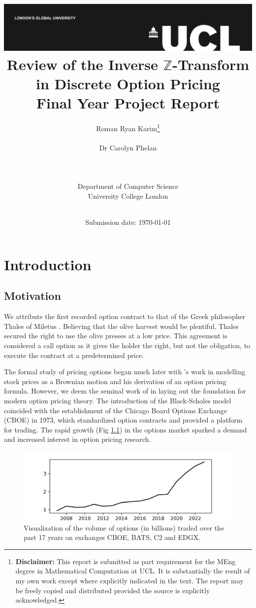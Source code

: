 \documentclass[a4paper]{report}
\title{{\vspace{-14em} \includegraphics[scale=0.4]{Logos/ucl_logo.png}}\\
{{\vspace{2em} \Huge Review of the Inverse $\mathbb{Z}$-Transform in Discrete Option Pricing}}\\
{\large Final Year Project Report}\\
}
\date{Submission date: \today}
\author{Roman Ryan Karim\thanks{
{\bf Disclaimer:}
This report is submitted as part requirement for the MEng degree in Mathematical Computation at UCL. It is substantially the result of my own work except where explicitly indicated in the text. The report may be freely copied and distributed provided the source is explicitly acknowledged.}
\\ \\ Dr Carolyn Phelan
\\ \\ \\ \\ Department of Computer Science
\\ University College London
\\ \\
}
\begin{document}
 
\onehalfspacing
\maketitle
\begin{abstract}

\end{abstract}

\tableofcontents
\setcounter{page}{1}

\chapter{Introduction}
\section{Motivation}
We attribute the first recorded option contract to that of the Greek philosopher Thales of Miletus \citep{thompson1994aristotle}. Believing that the olive harvest would be plentiful, Thales secured the right to use the olive presses at a low price. This agreement is considered a call option as it gives the holder the right, but not the obligation, to execute the contract at a predetermined price.

The formal study of pricing options began much later with \citet{bachelier1900theorie}'s work in modelling stock prices as a Brownian motion and his derivation of an option pricing formula. However, we deem the seminal work of \citet{black1973pricing} in laying out the foundation for modern option pricing theory. The introduction of the Black-Scholes model coincided with the establishment of the Chicago Board Options Exchange (CBOE) in 1973, which standardized option contracts and provided a platform for trading. The rapid growth (Fig \ref{fig:volume_of_options}) in the options market sparked a demand and increased interest in option pricing research.

\begin{figure}[h]
	\centering
	\includegraphics[width=0.7\linewidth]{images/options_volume.png}
    \caption{Visualization of the volume of options (in billions) traded over the past 17 years on exchanges CBOE, BATS, C2 and EDGX.}
    \label{fig:volume_of_options}
\end{figure}
\end{document}

